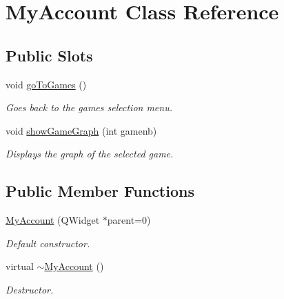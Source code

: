 \hypertarget{classMyAccount}{\section{\-My\-Account \-Class \-Reference}
\label{classMyAccount}
}
\subsection*{\-Public \-Slots}
\begin{DoxyCompactItemize}
\item 
void \hyperlink{classMyAccount_a9dc73e591e529adb0628291d2efe9dad}{go\-To\-Games} ()
\begin{DoxyCompactList}\small\item\em \-Goes back to the games selection menu. \end{DoxyCompactList}\item 
void \hyperlink{classMyAccount_aad84a64cbf944d18ecc14ca628e7336e}{show\-Game\-Graph} (int gamenb)
\begin{DoxyCompactList}\small\item\em \-Displays the graph of the selected game. \end{DoxyCompactList}\end{DoxyCompactItemize}
\subsection*{\-Public \-Member \-Functions}
\begin{DoxyCompactItemize}
\item 
\hyperlink{classMyAccount_a1ce3bceec0bd63885b8f85890128f23c}{\-My\-Account} (\-Q\-Widget $\ast$parent=0)
\begin{DoxyCompactList}\small\item\em \-Default constructor. \end{DoxyCompactList}\item 
virtual \hyperlink{classMyAccount_a68bdda0b0bd909f5e99d87118cf55ebd}{$\sim$\-My\-Account} ()
\begin{DoxyCompactList}\small\item\em \-Destructor. \end{DoxyCompactList}\end{DoxyCompactItemize}



